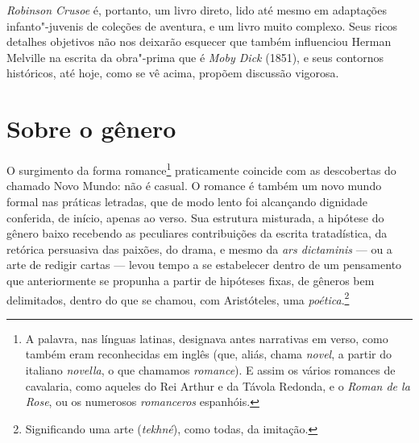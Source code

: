 \emph{Robinson Crusoe} é, portanto, um livro direto, lido até mesmo em
adaptações infanto"-juvenis de coleções de aventura, e um livro muito
complexo. Seus ricos detalhes objetivos não nos deixarão esquecer que
também influenciou Herman Melville na escrita da obra"-prima que é
\emph{Moby Dick} (1851), e seus contornos históricos, até hoje, como se
vê acima, propõem discussão vigorosa.



\section{Sobre o gênero}

O surgimento da forma romance\footnote{A palavra, nas línguas latinas,
  designava antes narrativas em verso, como também eram reconhecidas em
  inglês (que, aliás, chama \emph{novel}, a partir do italiano
  \emph{novella}, o que chamamos \emph{romance}). E assim os vários
  romances de cavalaria, como aqueles do Rei Arthur e da Távola Redonda,
  e o \emph{Roman de la Rose}, ou os numerosos \emph{romanceros}
  espanhóis.} praticamente coincide com as descobertas do chamado Novo
Mundo: não é casual. O romance é também um novo mundo formal nas
práticas letradas, que de modo lento foi alcançando dignidade conferida,
de início, apenas ao verso. Sua estrutura misturada, a hipótese do
gênero baixo recebendo as peculiares contribuições da escrita
tratadística, da retórica persuasiva das paixões, do drama, e mesmo da
\emph{ars dictaminis} --- ou a arte de redigir cartas --- levou tempo a
se estabelecer dentro de um pensamento que anteriormente se propunha a
partir de hipóteses fixas, de gêneros bem delimitados, dentro do que se
chamou, com Aristóteles, uma \emph{poética}.\footnote{Significando uma
  arte (\emph{tekhné}), como todas, da imitação.}

